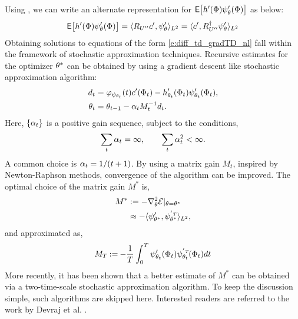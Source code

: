 Using , we can write an alternate representation for ${\sf E} \bigl[ h'(\Phi)\psi'_\theta (\Phi)\bigr]$ as below:
\begin{eqnarray*}
	{\sf E}\bigl[h'(\Phi)\psi'_\theta (\Phi)\bigr]=\langle R_{U''}c',\psi'_\theta\rangle_{L^2} =\langle c', R_{U''}^\dagger \psi'_\theta\rangle_{L^2}
\end{eqnarray*}
Obtaining solutions to equations of the form \eqref{e:diff_td_gradTD_nl} fall within the framework of stochastic approximation techniques. Recursive estimates for the optimizer $\theta^*$ can be obtained by using a gradient descent like stochastic approximation algorithm: %
\begin{equation}
\begin{aligned} 
d_t & = \eligibvector_{\basis_{\param_t}}(t)  c'(\markovstate_t) - h'_{\param_{t}}(\markovstate_t)\basis'_{\param_{t}}(\markovstate_t), \\
\param_t &=\param_{t-1} - \sagain_t M_{t}^{-1} d_t. 
\label{e:diff_td_gradTD_theta_sa} 
\end{aligned}
\end{equation} %
Here, $\{\alpha_t\}$ is a positive gain sequence, subject to the conditions, 
\begin{equation}
\sum_t \alpha_t = \infty, \qquad \sum_t \alpha_t^2 < \infty.
\end{equation}
A common choice is $\alpha_t = 1/(t+1)$. By using a matrix gain $M_t$, inspired by Newton-Raphson methods, convergence of the algorithm can be improved. The optimal choice of the matrix gain $M^*$ is, 
\begin{equation}
\begin{aligned}
M^* &:= -\nabla^2_{\theta}\mathcal{E}|_{\theta = \theta^*}\\
& \approx - \langle \psi'_{\theta^*}, \psi_{\theta^*}^{'{\hbox{\tiny\it T}}} \rangle_{L^2}, 
\end{aligned}
\end{equation} %
and approximated as,
\begin{equation}
M_T  \mathbin{:=}  -\frac{1}{T} \int_0^T \psi'_{\theta_t}(\Phi_t) \psi^{'{\hbox{\tiny\it T}}}_{\theta_t}(\Phi_t) dt
\end{equation}
More recently, it has been shown that a better estimate of $M^*$ can be obtained via a two-time-scale stochastic approximation algorithm. To keep the discussion simple, such algorithms are skipped here. Interested readers are referred to the work by Devraj et al. \cite{devmey17a}.
 
